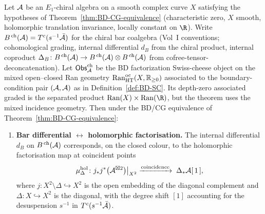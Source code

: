 \begin{theorem}[Bar differential = holomorphic factorisation,
coproduct = topological factorisation;
\ClaimStatusProvedHere]
\label{thm:bar-diff-eq-holfact}%
%
%
Let $\mathcal{A}$ be an $E_1$-chiral algebra on a smooth complex curve $X$
satisfying the hypotheses of Theorem~\ref{thm:BD-CG-equivalence}
(characteristic zero, $X$ smooth, holomorphic translation invariance,
locally constant on $\R$). Write
$B^{\,\mathrm{ch}}(\mathcal{A})=T^c(s^{-1}\bar{\mathcal{A}})$ for the chiral bar
coalgebra (Vol~I conventions; cohomological grading, internal differential
$d_B$ from the chiral product, internal coproduct
$\Delta_B\colon B^{\,\mathrm{ch}}(\mathcal{A})\to B^{\,\mathrm{ch}}(\mathcal{A})\otimes
B^{\,\mathrm{ch}}(\mathcal{A})$ from cofree-tensor-deconcatenation). Let
$\mathsf{Obs}^{\mathrm{ch}}_{\mathcal{A}}$ be the BD factorization Swiss-cheese object
on the mixed open--closed Ran geometry
$\mathrm{Ran}^{\mathrm{oc}}_{\mathrm{HT}}(X,\mathbb{R}_{\geq 0})$ associated
to the boundary-condition pair $(\mathcal{A},\mathcal{A})$ as in
Definition~\ref{def:BD-SC}. Its depth-zero associated graded is the
separated product $\Ran(X)\times\Ran(\R)$, but the theorem uses the
mixed incidence geometry. Then under the
BD/CG equivalence of Theorem~\ref{thm:BD-CG-equivalence}:
\begin{enumerate}[label=\textup{(\roman*)}]
\item \textbf{Bar differential $\leftrightarrow$ holomorphic
factorisation.} The internal differential $d_B$ on
$B^{\,\mathrm{ch}}(\mathcal{A})$ corresponds, on the closed colour, to the
holomorphic factorisation map at coincident points
\begin{equation}\label{eq:hol-fact-map}
 \mu^{\mathrm{hol}}_{\Delta}\colon
 j_*j^*\bigl(\mathcal{A}^{\boxtimes 2}\bigr)\bigl|_{X^2}
 \;\xrightarrow{\text{coincidence}}\;
 \Delta_*\mathcal{A}[\,1\,],
\end{equation}
where $j\colon X^2\setminus\Delta\hookrightarrow X^2$ is the open
embedding of the diagonal complement and $\Delta\colon X\hookrightarrow
X^2$ is the diagonal, with the degree shift $[1]$ accounting for the
desuspension $s^{-1}$ in $T^c(s^{-1}\bar{\mathcal{A}})$.


\end{enumerate}
\end{theorem}
